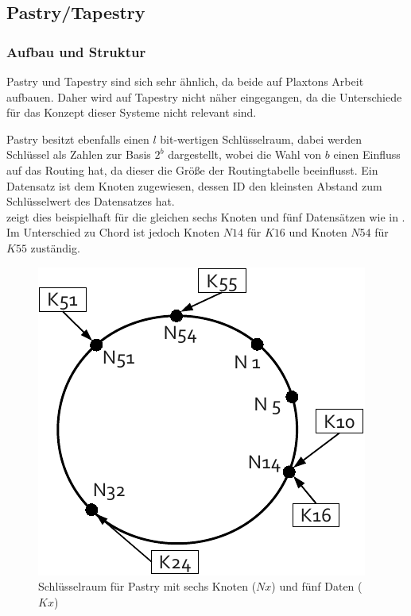\subsection{Pastry/Tapestry}
\label{chap:evaluation_pastry}

\subsubsection{Aufbau und Struktur}
Pastry \cite{Rowstron2001} und Tapestry \cite{Zhao2001Tapestry,Zhao2004Tapestry} sind sich sehr ähnlich, da beide auf Plaxtons Arbeit \cite{Plaxton1997Accessing} aufbauen. Daher wird auf Tapestry nicht näher eingegangen, da die Unterschiede für das Konzept dieser Systeme nicht relevant sind.

Pastry besitzt ebenfalls einen $l$ bit-wertigen Schlüsselraum, dabei werden Schlüssel als Zahlen zur Basis $2^b$ dargestellt, wobei die Wahl von $b$ einen Einfluss auf das Routing hat, da dieser die Größe der Routingtabelle beeinflusst. Ein Datensatz ist dem Knoten zugewiesen, dessen ID den kleinsten Abstand zum Schlüsselwert des Datensatzes hat.\\
 zeigt dies beispielhaft für die gleichen sechs Knoten und fünf Datensätzen wie in . Im Unterschied zu Chord ist jedoch Knoten $N14$ für $K16$ und Knoten $N54$ für $K55$ zuständig.


\begin{figure}[htbp]
\centering
\includegraphics{grafics/pastry_key_space.pdf}
\caption{Schlüsselraum für Pastry mit sechs Knoten ($Nx$) und fünf Daten ($Kx$)}
\label{fig:pastry_key_space}
\end{figure}

